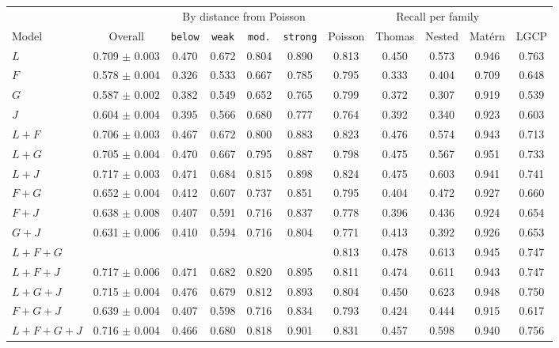 \begin{table}[ht]
\centering\footnotesize
\begin{tabular}{@{}l c cccc ccccc@{}}
\toprule
 & & \multicolumn{4}{c}{By distance from Poisson} & \multicolumn{5}{c}{Recall per family}\\
\cmidrule(lr){3-6}\cmidrule(l){7-11}
Model & Overall & \texttt{below} & \texttt{weak} & \texttt{mod.} & \texttt{strong} & Poisson & Thomas & Nested & Mat\'ern & LGCP\\
\midrule
$L$ & 0.709 $\pm$ 0.003 & 0.470 & 0.672 & 0.804 & 0.890 & 0.813 & 0.450 & 0.573 & 0.946 & 0.763\\
$F$ & 0.578 $\pm$ 0.004 & 0.326 & 0.533 & 0.667 & 0.785 & 0.795 & 0.333 & 0.404 & 0.709 & 0.648\\
$G$ & 0.587 $\pm$ 0.002 & 0.382 & 0.549 & 0.652 & 0.765 & 0.799 & 0.372 & 0.307 & 0.919 & 0.539\\
$J$ & 0.604 $\pm$ 0.004 & 0.395 & 0.566 & 0.680 & 0.777 & 0.764 & 0.392 & 0.340 & 0.923 & 0.603\\
$L{+}F$ & 0.706 $\pm$ 0.003 & 0.467 & 0.672 & 0.800 & 0.883 & 0.823 & 0.476 & 0.574 & 0.943 & 0.713\\
$L{+}G$ & 0.705 $\pm$ 0.004 & 0.470 & 0.667 & 0.795 & 0.887 & 0.798 & 0.475 & 0.567 & 0.951 & 0.733\\
$L{+}J$ & 0.717 $\pm$ 0.003 & 0.471 & 0.684 & 0.815 & 0.898 & 0.824 & 0.475 & 0.603 & 0.941 & 0.741\\
$F{+}G$ & 0.652 $\pm$ 0.004 & 0.412 & 0.607 & 0.737 & 0.851 & 0.795 & 0.404 & 0.472 & 0.927 & 0.660\\
$F{+}J$ & 0.638 $\pm$ 0.008 & 0.407 & 0.591 & 0.716 & 0.837 & 0.778 & 0.396 & 0.436 & 0.924 & 0.654\\
$G{+}J$ & 0.631 $\pm$ 0.006 & 0.410 & 0.594 & 0.716 & 0.804 & 0.771 & 0.413 & 0.392 & 0.926 & 0.653\\
$L{+}F{+}G$ & \B{0.719 $\pm$ 0.003} & \B{0.473} & \B{0.684} & \B{0.819} & \B{0.899} & 0.813 & 0.478 & 0.613 & 0.945 & 0.747\\
$L{+}F{+}J$ & 0.717 $\pm$ 0.006 & 0.471 & 0.682 & 0.820 & 0.895 & 0.811 & 0.474 & 0.611 & 0.943 & 0.747\\
$L{+}G{+}J$ & 0.715 $\pm$ 0.004 & 0.476 & 0.679 & 0.812 & 0.893 & 0.804 & 0.450 & 0.623 & 0.948 & 0.750\\
$F{+}G{+}J$ & 0.639 $\pm$ 0.004 & 0.407 & 0.598 & 0.716 & 0.834 & 0.793 & 0.424 & 0.444 & 0.915 & 0.617\\
$L{+}F{+}G{+}J$ & 0.716 $\pm$ 0.004 & 0.466 & 0.680 & 0.818 & 0.901 & 0.831 & 0.457 & 0.598 & 0.940 & 0.756\\

\end{tabular}
\end{table}
